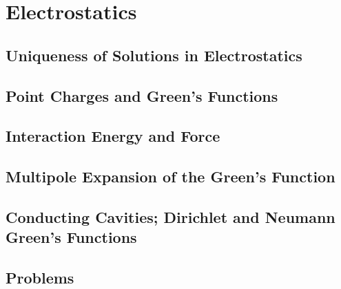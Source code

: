 \setcounter{chapter}{0}
\renewcommand{\thechapter}{2}
\chapter{Electrostatics}\label{ch:2}
\setcounter{equation}{0}	        %

\section{Uniqueness of Solutions in Electrostatics}

\section{Point Charges and Green's Functions}

\section{Interaction Energy and Force}

\section{Multipole Expansion of the Green's Function}

\section{Conducting Cavities; Dirichlet and Neumann Green's Functions} 


\section*{Problems}


